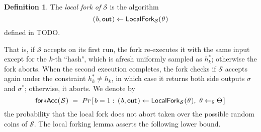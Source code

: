 \documentclass[psamsfonts, reqno]{amsart}
\theoremstyle{definition}
\newtheorem{defn}[thm]{Definition}
\theoremstyle{remark}
\numberwithin{equation}{section}
\begin{document}
\begin{defn}
The \textit{local fork of} $\mathcal{S}$ is the algorithm
\vspace{5pt}
\begin{equation*}(
	\hspace{0.5pt}
	b,
	\mathsf{out}
	\hspace{0.5pt}
) \leftarrow
\mathsf{LocalFork}_{\mathcal{S}}(
	\hspace{0.5pt}
	\theta
	\hspace{0.5pt}
)
\vspace{5pt}
\end{equation*}
defined in TODO.
\end{defn}
\noindent
That is, if $\mathcal{S}$ accepts on its first run,
the fork re-executes it with the same input except
for the $k$-th ``hash", which is
afresh uniformly sampled as $h_k^*$;
otherwise the fork aborts.
When the second execution completes, the fork checks
if $\mathcal{S}$ accepts again under the constraint
$h_k^* \neq h_k$, in which case it returns both side
outputs $\sigma$ and $\sigma^*$;
otherwise, it aborts. We denote by
\vspace{5pt}
\begin{equation}\label{local_forking_forkacc}
\mathsf{forkAcc}
\hspace{0.5pt}
(
	\hspace{0.5pt}
	\mathcal{S}
	\hspace{0.5pt}
)
\hspace{3pt}
=
\hspace{3pt}
Pr\hspace{1pt}[\hspace{1.5pt}b = 1 :
\hspace{2pt}(
	\hspace{1pt}
	b,
	\mathsf{out}
	\hspace{1pt}
)
\leftarrow
\mathsf{LocalFork}_{\mathcal{S}}
	\hspace{0.5pt}(
	\hspace{0.5pt}
	\theta
	\hspace{0.5pt}
),
\ \theta \leftarrow_\$ \Theta
\hspace{1.5pt}]\hspace{1pt}
\vspace{8pt}
\end{equation}
the probability that the local fork does not abort
taken over the possible random coins of $\mathcal{S}$.
The local forking lemma asserts the following lower bound.
\end{document}
